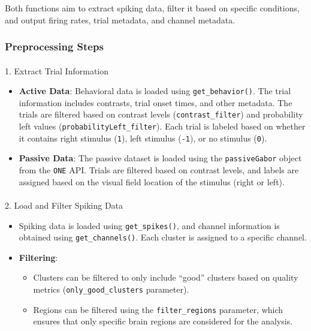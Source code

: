 \documentclass[
  letterpaper,
  DIV=11,
  numbers=noendperiod]{scrartcl}
\makeatletter
\let\oldparagraph\paragraph
\renewcommand{\paragraph}{
    \@ifstar
      \xxxParagraphStar
      \xxxParagraphNoStar
  }
\newcommand{\xxxParagraphStar}[1]{\oldparagraph*{#1}\mbox{}}
\newcommand{\xxxParagraphNoStar}[1]{\oldparagraph{#1}\mbox{}}
\providecommand{\tightlist}{%
  \setlength{\itemsep}{0pt}\setlength{\parskip}{0pt}}\usepackage{longtable,booktabs,array}
\makeatother
\begin{document}
Both functions aim to extract spiking data, filter it based on specific
conditions, and output firing rates, trial metadata, and channel
metadata.

\subsubsection{Preprocessing Steps}\label{preprocessing-steps}

\paragraph{1. Extract Trial
Information}\label{extract-trial-information}

\begin{itemize}
\tightlist
\item
  \textbf{Active Data}: Behavioral data is loaded using
  \texttt{get\_behavior()}. The trial information includes contrasts,
  trial onset times, and other metadata. The trials are filtered based
  on contrast levels (\texttt{contrast\_filter}) and probability left
  values (\texttt{probabilityLeft\_filter}). Each trial is labeled based
  on whether it contains right stimulus (\texttt{1}), left stimulus
  (\texttt{-1}), or no stimulus (\texttt{0}).
\item
  \textbf{Passive Data}: The passive dataset is loaded using the
  \texttt{passiveGabor} object from the \texttt{ONE} API. Trials are
  filtered based on contrast levels, and labels are assigned based on
  the visual field location of the stimulus (right or left).
\end{itemize}

\paragraph{2. Load and Filter Spiking
Data}\label{load-and-filter-spiking-data}

\begin{itemize}
\tightlist
\item
  Spiking data is loaded using \texttt{get\_spikes()}, and channel
  information is obtained using \texttt{get\_channels()}. Each cluster
  is assigned to a specific channel.
\item
  \textbf{Filtering}:

  \begin{itemize}
  \tightlist
  \item
    Clusters can be filtered to only include ``good'' clusters based on
    quality metrics (\texttt{only\_good\_clusters} parameter).
  \item
    Regions can be filtered using the \texttt{filter\_regions}
    parameter, which ensures that only specific brain regions are
    considered for the analysis.
  \end{itemize}
\end{itemize}
\end{document}
